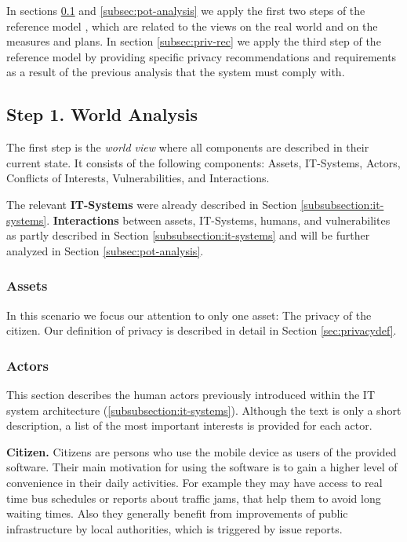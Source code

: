 \documentclass[runningheads,a4paper]{llncs}
\begin{document}
In sections \ref{subsec:world-analysis} and \ref{subsec:pot-analysis} we apply the first two steps of the reference model \cite{Grimm:ItSecRefModel}, which are related to the views on the real world and on the measures and plans. In section \ref{subsec:priv-rec} we apply the third step of the reference model by providing specific privacy recommendations and requirements as a result of the previous analysis that the system must comply with. 


\subsection{Step 1. World Analysis}

\label{subsec:world-analysis}

The first step is the \emph{world view} where all components are described in their current state. It consists of the following components: Assets, IT-Systems, Actors, Conflicts of Interests, Vulnerabilities, and Interactions.

The relevant \textbf{IT-Systems} were already described in Section \ref{subsubsection:it-systems}.
\textbf{Interactions} between assets, IT-Systems, humans, and vulnerabilites as partly described in Section \ref{subsubsection:it-systems} and will be further analyzed in Section \ref{subsec:pot-analysis}.
	

\subsubsection{Assets}

In this scenario we focus our attention to only one asset: The privacy of the citizen. Our definition of privacy is described in detail in Section \ref{sec:privacydef}.

\subsubsection{Actors}
\label{subsubsection:humans}

This section describes the human actors previously introduced within the IT system architecture (\ref{subsubsection:it-systems}). Although the text is only a short description, a list of the most important interests is provided for each actor.

\textbf{Citizen.}
Citizens are persons who use the mobile device as users of the provided software.
Their main motivation for using the software is to gain a higher level of convenience in their daily activities. For example they may have access to real time bus schedules or reports about traffic jams, that help them to avoid long waiting times. Also they generally benefit from improvements of public infrastructure by local authorities, which is triggered by issue reports.
\end{document}
